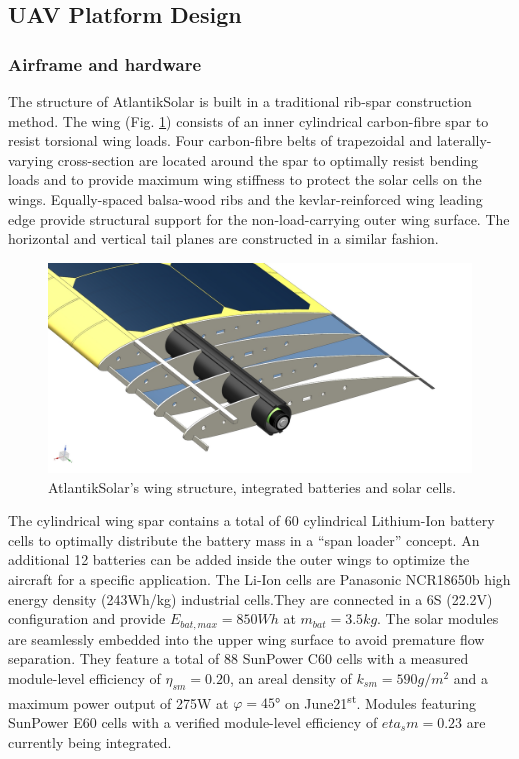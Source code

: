 \subsection{UAV Platform Design}
\subsubsection{Airframe and hardware}
\label{secsec:Airframe and hardware}

The structure of AtlantikSolar is built in a traditional rib-spar construction method. The wing (Fig. \ref{fig:CAD_AtlantikSolarStructure}) consists of an inner cylindrical carbon-fibre spar to resist torsional wing loads. Four carbon-fibre belts of trapezoidal and laterally-varying cross-section are located around the spar to optimally resist bending loads and to provide maximum wing stiffness to protect the solar cells on the wings. Equally-spaced balsa-wood ribs and the kevlar-reinforced wing leading edge provide structural support for the non-load-carrying outer wing surface. The horizontal and vertical tail planes are constructed in a similar fashion.

\begin{figure}[tb]
    \centering
    \includegraphics[width=\linewidth]{images/7_CAD_AtlantikSolarStructure}
    \caption{AtlantikSolar's wing structure, integrated batteries and solar cells.}
    \label{fig:CAD_AtlantikSolarStructure}
\end{figure}

The cylindrical wing spar contains a total of 60 cylindrical Lithium-Ion battery cells to optimally distribute the battery mass in a ``span loader'' concept. An additional 12 batteries can be added inside the outer wings to optimize the aircraft for a specific application. The Li-Ion cells are Panasonic NCR18650b high energy density (243Wh/kg) industrial cells.They are connected in a 6S (22.2V) configuration and provide $E_{bat,max}=850Wh$ at $m_{bat}=3.5kg$. The solar modules are seamlessly embedded into the upper wing surface to avoid premature flow separation. They feature a total of 88 SunPower C60 cells with a measured module-level efficiency of $\eta_{sm}=0.20$, an areal density of $k_{sm}=590g/m^2$ and a maximum power output of 275W at $\varphi=45°$ on June21\textsuperscript{st}. Modules featuring SunPower E60 cells with a verified module-level efficiency of $eta_sm=0.23$ are currently being integrated.

